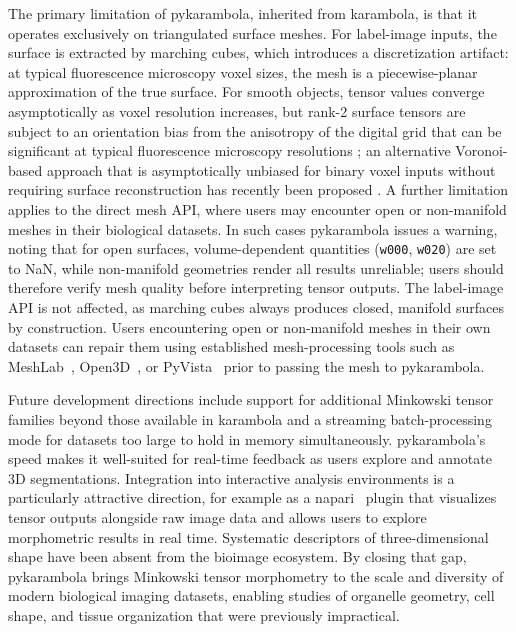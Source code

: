 \documentclass[times, twoside, watermark]{zHenriquesLab-StyleBioRxiv}
\newcommand{\newtxt}[1]{\textcolor{chgadded}{#1}}
\begin{document}
The primary limitation of pykarambola, inherited from karambola, is that it operates exclusively on triangulated surface meshes.
For label-image inputs, the surface is extracted by marching cubes, which introduces a discretization artifact: at typical fluorescence microscopy voxel sizes, the mesh is a piecewise-planar approximation of the true surface.
For smooth objects, tensor values converge asymptotically as voxel resolution increases, but rank-2 surface tensors are subject to an orientation bias from the anisotropy of the digital grid that can be significant at typical fluorescence microscopy resolutions \cite{Svane2017}; an alternative Voronoi-based approach that is asymptotically unbiased for binary voxel inputs without requiring surface reconstruction has recently been proposed \cite{Hug2025}.
A further limitation applies to the direct mesh API, where users may encounter open or non-manifold meshes in their biological datasets.
In such cases pykarambola issues a warning, noting that for open surfaces, volume-dependent quantities (\texttt{w000}, \texttt{w020}) are set to NaN, while non-manifold geometries render all results unreliable; users should therefore verify mesh quality before interpreting tensor outputs.
The label-image API is not affected, as marching cubes always produces closed, manifold surfaces by construction.
\newtxt{Users encountering open or non-manifold meshes in their own datasets can repair them using established mesh-processing tools such as MeshLab~\cite{Cignoni2008meshlab}, Open3D~\cite{Zhou2018open3d}, or PyVista~\cite{Sullivan2019pyvista} prior to passing the mesh to pykarambola.}

Future development directions include support for additional Minkowski tensor families beyond those available in karambola and a streaming batch-processing mode for datasets too large to hold in memory simultaneously.
pykarambola's speed makes it well-suited for real-time feedback as users explore and annotate 3D segmentations.
Integration into interactive analysis environments is a particularly attractive direction, for example as a napari~\cite{Sofroniew2026napari} plugin that visualizes tensor outputs alongside raw image data and allows users to explore morphometric results in real time.
Systematic descriptors of three-dimensional shape have been absent from the bioimage ecosystem. By closing that gap, pykarambola brings Minkowski tensor morphometry to the scale and diversity of modern biological imaging datasets, enabling studies of organelle geometry, cell shape, and tissue organization that were previously impractical.
\end{document}

